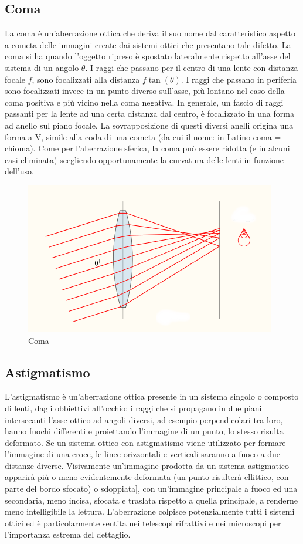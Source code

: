 \subsection{Coma}  
La coma è un'aberrazione ottica che deriva il suo nome dal caratteristico
aspetto a cometa delle immagini create dai sistemi ottici che presentano tale
difetto. La coma si ha quando l'oggetto ripreso è spostato lateralmente
rispetto all'asse del sistema di un angolo $\theta$. I raggi che passano per il
centro di una lente con distanza focale $f$, sono focalizzati alla distanza $f \tan(\theta)$.
I raggi che passano in periferia sono focalizzati invece in un punto
diverso sull'asse, più lontano nel caso della coma positiva e più vicino nella
coma negativa. In generale, un fascio di raggi passanti per la lente ad una
certa distanza dal centro, è focalizzato in una forma ad anello sul piano
focale. La sovrapposizione di questi diversi anelli origina una forma a V,
simile alla coda di una cometa (da cui il nome: in Latino coma = chioma). Come
per l'aberrazione sferica, la coma può essere ridotta (e in alcuni casi
eliminata) scegliendo opportunamente la curvatura delle lenti in funzione
dell'uso.

\begin{figure}

\centering
\includegraphics[width=.5\textwidth]{img/coma.png}

\caption{Coma}
\label{fig:coma}
\end{figure}

\subsection{Astigmatismo}

L'astigmatismo è un'aberrazione ottica presente in un sistema singolo o
composto di lenti, dagli obbiettivi all'occhio; i raggi che si propagano in
due piani intersecanti l'asse ottico ad angoli diversi, ad esempio
perpendicolari tra loro, hanno fuochi differenti e proiettando l'immagine di
un punto, lo stesso risulta deformato. Se un sistema ottico con astigmatismo
viene utilizzato per formare l'immagine di una croce, le linee orizzontali e
verticali saranno a fuoco a due distanze diverse. Visivamente un'immagine
prodotta da un sistema astigmatico apparirà più o meno evidentemente deformata
(un punto risulterà ellittico, con parte del bordo sfocato) o sdoppiata], con
un'immagine principale a fuoco ed una secondaria, meno incisa, sfocata e
traslata rispetto a quella principale, a renderne meno intelligibile la
lettura. L'aberrazione colpisce potenzialmente tutti i sistemi ottici ed è
particolarmente sentita nei telescopi rifrattivi e nei microscopi  per
l'importanza estrema del dettaglio.

